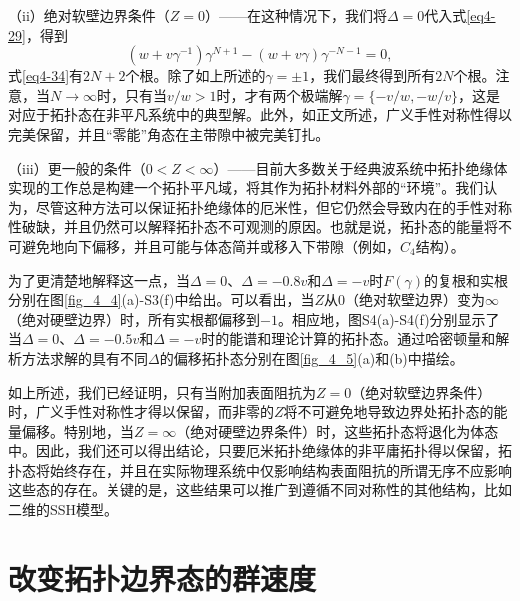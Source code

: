 （ii）绝对软壁边界条件（\(Z = 0\)）——在这种情况下，我们将\(\Delta = 0\)代入式\ref{eq4-29}，得到
\begin{equation}\label{eq4-34}
(w + v\gamma^{-1})\gamma^{N + 1}-(w + v\gamma)\gamma^{-N - 1}=0,
\end{equation}
式\ref{eq4-34}有\(2N + 2\)个根。除了如上所述的\(\gamma=\pm1\)，我们最终得到所有\(2N\)个根。注意，当\(N\rightarrow\infty\)时，只有当\(v/w > 1\)时，才有两个极端解\(\gamma = \{-v/w, -w/v\}\)，这是对应于拓扑态在非平凡系统中的典型解。此外，如正文所述，广义手性对称性得以完美保留，并且“零能”角态在主带隙中被完美钉扎。

（iii）更一般的条件（\(0 < Z < \infty\)）——目前大多数关于经典波系统中拓扑绝缘体实现的工作总是构建一个拓扑平凡域，将其作为拓扑材料外部的“环境”。我们认为，尽管这种方法可以保证拓扑绝缘体的厄米性，但它仍然会导致内在的手性对称性破缺，并且仍然可以解释拓扑态不可观测的原因。也就是说，拓扑态的能量将不可避免地向下偏移，并且可能与体态简并或移入下带隙（例如，\(C_{4}\)结构）。

为了更清楚地解释这一点，当\(\Delta = 0\)、\(\Delta = -0.8v\)和\(\Delta = -v\)时\(F(\gamma)\)的复根和实根分别在图\ref{fig_4_4}(a)-S3(f)中给出。可以看出，当\(Z\)从\(0\)（绝对软壁边界）变为\(\infty\)（绝对硬壁边界）时，所有实根都偏移到\(-1\)。相应地，图S4(a)-S4(f)分别显示了当\(\Delta = 0\)、\(\Delta = -0.5v\)和\(\Delta = -v\)时的能谱和理论计算的拓扑态。通过哈密顿量和解析方法求解的具有不同\(\Delta\)的偏移拓扑态分别在图\ref{fig_4_5}(a)和(b)中描绘。

如上所述，我们已经证明，只有当附加表面阻抗为\(Z = 0\)（绝对软壁边界条件）时，广义手性对称性才得以保留，而非零的\(Z\)将不可避免地导致边界处拓扑态的能量偏移。特别地，当\(Z = \infty\)（绝对硬壁边界条件）时，这些拓扑态将退化为体态中。因此，我们还可以得出结论，只要厄米拓扑绝缘体的非平庸拓扑得以保留，拓扑态将始终存在，并且在实际物理系统中仅影响结构表面阻抗的所谓无序不应影响这些态的存在。关键的是，这些结果可以推广到遵循不同对称性的其他结构，比如二维的SSH模型。

\section{改变拓扑边界态的群速度}

